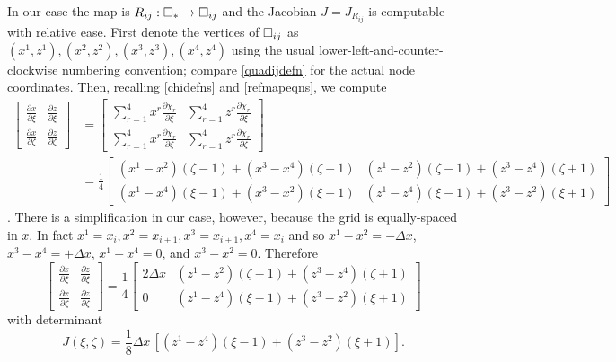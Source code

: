 \documentclass[11pt,final,reqno]{amsart}
\theoremstyle{remark}
\theoremstyle{definition}
\begin{document}
In our case the map is $R_{ij}:\square_{\ast}\to\square_{ij}$ and the Jacobian $J=J_{R_{ij}}$ is computable with relative ease.  First denote the vertices of $\square_{ij}$ as $(x^1,z^1),(x^2,z^2),(x^3,z^3),(x^4,z^4)$ using the usual lower-left-and-counter-clockwise numbering convention; compare \eqref{quadijdefn} for the actual node coordinates.  Then, recalling \eqref{chidefns} and \eqref{refmapeqns}, we compute
\begin{align*}
  \begin{bmatrix}
    \frac{\partial x}{\partial \xi} & \frac{\partial z}{\partial \xi} \\
    \frac{\partial x}{\partial \zeta} & \frac{\partial z}{\partial \zeta}
  \end{bmatrix}
&=
  \begin{bmatrix}
     \sum_{r=1}^4 x^r \frac{\partial \chi_r}{\partial \xi} & \sum_{r=1}^4 z^r \frac{\partial \chi_r}{\partial \xi} \\
	 \sum_{r=1}^4 x^r \frac{\partial \chi_r}{\partial \zeta} & \sum_{r=1}^4 z^r \frac{\partial \chi_r}{\partial \zeta}
  \end{bmatrix} \\
&= \frac{1}{4}
  \begin{bmatrix}
    (x^1 - x^2) (\zeta - 1) + (x^3 - x^4) (\zeta + 1) & (z^1 - z^2) (\zeta - 1) + (z^3 - z^4) (\zeta + 1) \\
	(x^1 - x^4) (\xi - 1) + (x^3 - x^2) (\xi + 1)     & (z^1 - z^4) (\xi - 1) + (z^3 - z^2) (\xi + 1)
  \end{bmatrix}
\end{align*}
\cite[compare (1.48)]{Elmanetal2005}.  There is a simplification in our case, however, because the grid is equally-spaced in $x$.  In fact $x^1=x_i,x^2=x_{i+1},x^3=x_{i+1},x^4=x_i$ and so $x^1-x^2=-\Delta x$, $x^3-x^4 = +\Delta x$, $x^1 - x^4 = 0$, and $x^3-x^2=0$.  Therefore
\begin{equation}
\begin{bmatrix}
    \frac{\partial x}{\partial \xi} & \frac{\partial z}{\partial \xi} \\
    \frac{\partial x}{\partial \zeta} & \frac{\partial z}{\partial \zeta}
  \end{bmatrix}
= \frac{1}{4}
  \begin{bmatrix}
    2 \Delta x & (z^1 - z^2) (\zeta - 1) + (z^3 - z^4) (\zeta + 1) \\
	0   & (z^1 - z^4) (\xi - 1) + (z^3 - z^2) (\xi + 1)
  \end{bmatrix}  \label{jacmatrix}
\end{equation}
with determinant
\begin{equation}
  J(\xi,\zeta) = \frac{1}{8} \Delta x\, \left[ (z^1 - z^4) (\xi - 1) + (z^3 - z^2) (\xi + 1)\right]. \label{jacobianij}
\end{equation}
\end{document}
